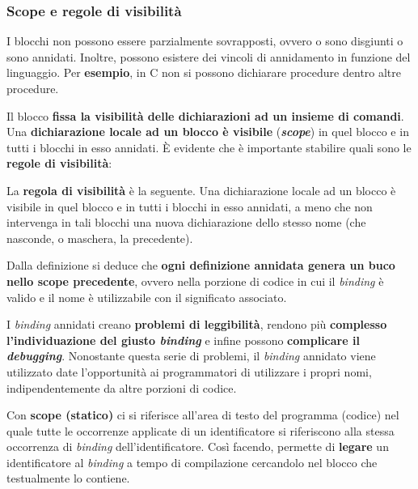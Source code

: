 \documentclass[a4paper]{article}
\begin{document}
 	\subsubsection{Scope e regole di visibilità}
 	
 	I blocchi non possono essere parzialmente sovrapposti, ovvero o sono disgiunti o sono annidati. Inoltre, possono esistere dei vincoli di annidamento in funzione del linguaggio. Per \textcolor{Green4}{\textbf{esempio}}, in C non si possono dichiarare procedure dentro altre procedure.\newline
 	
 	\noindent
 	Il blocco \textbf{fissa la visibilità delle dichiarazioni ad un insieme di comandi}. Una \textbf{dichiarazione locale ad un blocco è visibile} (\textcolor{Red3}{\textbf{\emph{scope}}}) in quel blocco e in tutti i blocchi in esso annidati. È evidente che è importante stabilire quali sono le \textbf{regole di visibilità}:
 	\begin{boxdef}
 		La \textcolor{Red3}{\textbf{regola di visibilità}} è la seguente. Una dichiarazione locale ad un blocco è visibile in quel blocco e in tutti i blocchi in esso annidati, a meno che non intervenga in tali blocchi una nuova dichiarazione dello stesso nome (che nasconde, o maschera, la precedente).
 	\end{boxdef}
 	
	\noindent
	Dalla definizione si deduce che \textbf{ogni definizione annidata genera un buco nello scope precedente}, ovvero nella porzione di codice in cui il \emph{binding} è valido e il nome è utilizzabile con il significato associato.
	
	I \emph{binding} annidati creano \textbf{problemi di leggibilità}, rendono più \textbf{complesso l'individuazione del giusto \emph{binding}} e infine possono \textbf{complicare il \emph{debugging}}. Nonostante questa serie di problemi, il \emph{binding} annidato viene utilizzato date l'opportunità ai programmatori di utilizzare i propri nomi, indipendentemente da altre porzioni di codice.
	
	\begin{boxdef}
		Con \textcolor{Red3}{\textbf{scope (statico)}} ci si riferisce all'area di testo del programma (codice) nel quale tutte le occorrenze applicate di un identificatore si riferiscono alla stessa occorrenza di \emph{binding} dell'identificatore. Così facendo, permette di \textbf{legare} un identificatore al \emph{binding} a tempo di compilazione cercandolo nel blocco che testualmente lo contiene.
	\end{boxdef}\newpage
 	
\end{document}
